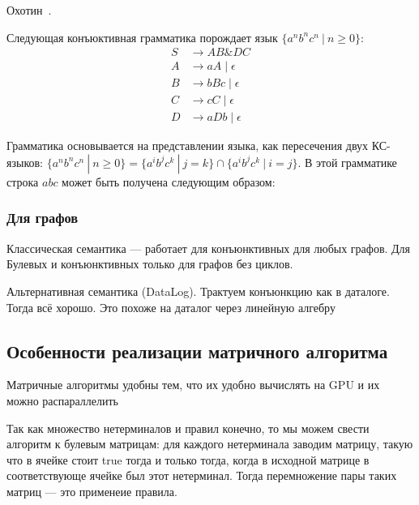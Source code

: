 Охотин~\cite{Okhotin:2003:BG:1758089.1758123,f60a33d409364914be560cac0e54b12c,Okhotin:2014:PMM:2565359.2565379}.
\begin{example}
	Следующая конъюктивная грамматика порождает язык $ \{a^nb^nc^n~|~n \geq 0\}$:
	\begin{align*}
	S   &\to A B \& D C \\ 
	A  &\to a A \mid \epsilon \\ 
	B &\to b B c \mid \epsilon \\
	C   &\to c C \mid \epsilon \\ 
	D   &\to aDb \mid \epsilon
	\end{align*}
	
	Грамматика основывается на представлении языка, как пересечения двух КС-языков: $\{a^nb^nc^n~|~n \geq 0\}=\{a^ib^jc^k~|~j = k\} \cap \{a^ib^jc^k~|~i = j\}$. В этой грамматике строка $abc$ может быть получена следующим образом:
\end{example}
\subsubsection{Для графов}


Классическая семантика --- работает для конъюнктивных для любых графов.
Для Булевых и конъюнктивных только для графов без циклов.

Альтернативная семантика (DataLog).
Трактуем конъюнкцию как в даталоге. Тогда всё хорошо.
Это похоже на даталог через линейную алгебру~\cite{!!!}
\subsection{Особенности реализации матричного алгоритма}

Матричные алгоритмы удобны тем, что их удобно вычислять на GPU и их можно распараллелить~\cite{Mishin:2019:ECP:3327964.3328503}

Так как множество нетерминалов и правил конечно, то мы можем свести алгоритм к булевым матрицам: для каждого нетерминала заводим матрицу, такую что в ячейке стоит true тогда и только тогда, когда в исходной матрице в соответствующе ячейке был этот нетерминал.
Тогда перемножение пары таких матриц --- это применеие правила.


